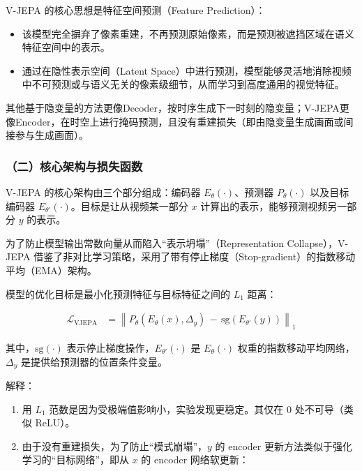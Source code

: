 V-JEPA 的核心思想是特征空间预测（Feature Prediction）：

\begin{itemize}
\tightlist
\item
  该模型完全摒弃了像素重建，不再预测原始像素，而是预测被遮挡区域在语义特征空间中的表示。
\item
  通过在隐性表示空间（Latent Space）中进行预测，模型能够灵活地消除视频中不可预测或与语义无关的像素级细节，从而学习到高度通用的视觉特征。
\end{itemize}

其他基于隐变量的方法更像Decoder，按时序生成下一时刻的隐变量；V-JEPA更像Encoder，在时空上进行掩码预测，且没有重建损失（即由隐变量生成画面或间接参与生成画面）。

\hypertarget{ux4e8cux6838ux5fc3ux67b6ux6784ux4e0eux635fux5931ux51fdux6570}{%
\subsubsection{（二）核心架构与损失函数}\label{ux4e8cux6838ux5fc3ux67b6ux6784ux4e0eux635fux5931ux51fdux6570}}

V-JEPA 的核心架构由三个部分组成：编码器 \(E_\theta(\cdot)\)、预测器 \(P_\theta(\cdot)\) 以及目标编码器 \(E_{\theta'}(\cdot)\)。目标是让从视频某一部分 \(x\) 计算出的表示，能够预测视频另一部分 \(y\) 的表示。

为了防止模型输出常数向量从而陷入``表示坍塌''（Representation Collapse），V-JEPA 借鉴了非对比学习策略，采用了带有停止梯度（Stop-gradient）的指数移动平均（EMA）架构。

模型的优化目标是最小化预测特征与目标特征之间的 \(L_1\) 距离：

\[
\begin{aligned}
\mathcal{L}_{\mathrm{VJEPA}}
&=
\left\|
P_\theta(E_\theta(x),\Delta_y)
\, - \, \mathrm{sg}(E_{\theta'}(y))
\right\|_1
\end{aligned}
\]

其中，\(\mathrm{sg}(\cdot)\) 表示停止梯度操作，\(E_{\theta'}(\cdot)\) 是 \(E_\theta(\cdot)\) 权重的指数移动平均网络，\(\Delta_y\) 是提供给预测器的位置条件变量。

解释：

\begin{enumerate}
\def\labelenumi{\arabic{enumi}.}
\item
  用 \(L_1\) 范数是因为受极端值影响小，实验发现更稳定。其仅在 \(0\) 处不可导（类似 ReLU）。
\item
  由于没有重建损失，为了防止``模式崩塌''，\(y\) 的 encoder 更新方法类似于强化学习的``目标网络''，即从 \(x\) 的 encoder 网络软更新：
\end{enumerate}

